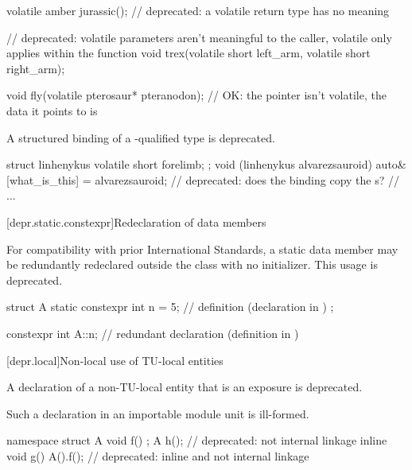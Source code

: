 \begin{example}
\begin{codeblock}
volatile amber jurassic();  // deprecated: a volatile return type has no meaning

// deprecated: volatile parameters aren't meaningful to the caller, volatile only applies within the function
void trex(volatile short left_arm, volatile short right_arm);

void fly(volatile pterosaur* pteranodon);   // OK: the pointer isn't volatile, the data it points to is
\end{codeblock}
\end{example}


\pnum
A structured binding of a -qualified type
is deprecated.

\begin{example}
\begin{codeblock}
struct linhenykus { volatile short forelimb; };
void (linhenykus alvarezsauroid) {
  auto& [what_is_this] = alvarezsauroid;    // deprecated: does the binding copy the s?
  // ...
}
\end{codeblock}
\end{example}


[depr.static.constexpr]{Redeclaration of  data members}

\pnum
For compatibility with prior \Cpp{} International Standards, a 
static data member may be redundantly redeclared outside the class with no initializer.
This usage is deprecated.
\begin{example}
\begin{codeblock}
struct A {
  static constexpr int n = 5;   // definition (declaration in \CppXIV{})
};

constexpr int A::n;             // redundant declaration (definition in \CppXIV{})
\end{codeblock}
\end{example}

[depr.local]{Non-local use of TU-local entities}

\pnum
A declaration of a non-TU-local entity that is an exposure
is deprecated.
\begin{note}
Such a declaration in an importable module unit is ill-formed.
\end{note}
\begin{example}
\begin{codeblock}
namespace {
  struct A {
    void f() {}
  };
}
A h();                          // deprecated: not internal linkage
inline void g() {A().f();}      // deprecated: inline and not internal linkage
\end{codeblock}
\end{example}

